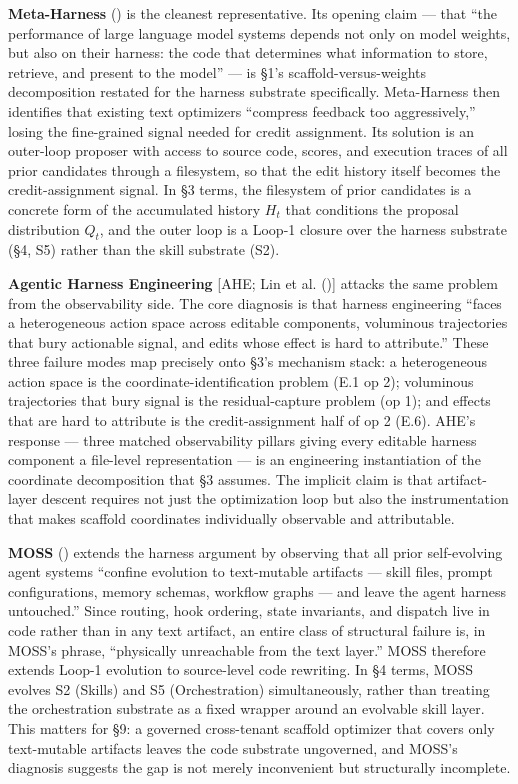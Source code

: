 \documentclass[
]{article}
\begin{document}
\textbf{Meta-Harness} () is the cleanest representative. Its opening claim --- that ``the
performance of large language model systems depends not only on model
weights, but also on their harness: the code that determines what
information to store, retrieve, and present to the model'' --- is §1's
scaffold-versus-weights decomposition restated for the harness substrate
specifically. Meta-Harness then identifies that existing text optimizers
``compress feedback too aggressively,'' losing the fine-grained signal
needed for credit assignment. Its solution is an outer-loop proposer
with access to source code, scores, and execution traces of all prior
candidates through a filesystem, so that the edit history itself becomes
the credit-assignment signal. In §3 terms, the filesystem of prior
candidates is a concrete form of the accumulated history \(H_t\) that
conditions the proposal distribution \(Q_t\), and the outer loop is a
Loop-1 closure over the harness substrate (§4, S5) rather than the skill
substrate (S2).

\textbf{Agentic Harness Engineering} {[}AHE; Lin et al.
(){]} attacks the same problem from the
observability side. The core diagnosis is that harness engineering
``faces a heterogeneous action space across editable components,
voluminous trajectories that bury actionable signal, and edits whose
effect is hard to attribute.'' These three failure modes map precisely
onto §3's mechanism stack: a heterogeneous action space is the
coordinate-identification problem (E.1 op 2); voluminous trajectories
that bury signal is the residual-capture problem (op 1); and effects
that are hard to attribute is the credit-assignment half of op 2 (E.6).
AHE's response --- three matched observability pillars giving every
editable harness component a file-level representation --- is an
engineering instantiation of the coordinate decomposition that §3
assumes. The implicit claim is that artifact-layer descent requires not
just the optimization loop but also the instrumentation that makes
scaffold coordinates individually observable and attributable.

\textbf{MOSS} () extends the
harness argument by observing that all prior self-evolving agent systems
``confine evolution to text-mutable artifacts --- skill files, prompt
configurations, memory schemas, workflow graphs --- and leave the agent
harness untouched.'' Since routing, hook ordering, state invariants, and
dispatch live in code rather than in any text artifact, an entire class
of structural failure is, in MOSS's phrase, ``physically unreachable
from the text layer.'' MOSS therefore extends Loop-1 evolution to
source-level code rewriting. In §4 terms, MOSS evolves S2 (Skills) and
S5 (Orchestration) simultaneously, rather than treating the
orchestration substrate as a fixed wrapper around an evolvable skill
layer. This matters for §9: a governed cross-tenant scaffold optimizer
that covers only text-mutable artifacts leaves the code substrate
ungoverned, and MOSS's diagnosis suggests the gap is not merely
inconvenient but structurally incomplete.
\end{document}
